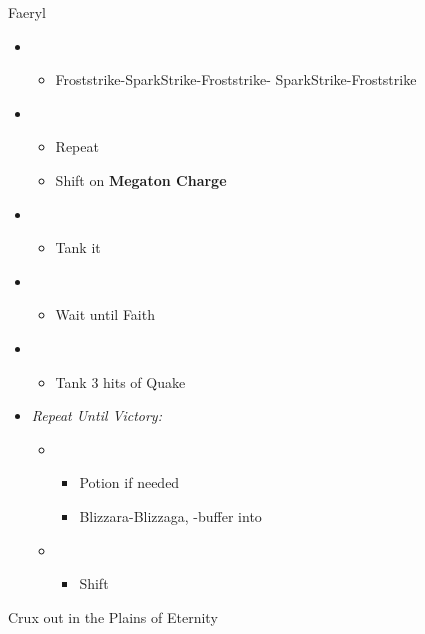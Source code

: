 \begin{battle}{Faeryl}
\begin{itemize}
	\item \sixth
	\begin{itemize}
		\item Froststrike-SparkStrike-Froststrike- SparkStrike-Froststrike
	\end{itemize}
	\item \fifth
	\begin{itemize}
		\item Repeat
		\item Shift on \textbf{Megaton Charge}
	\end{itemize}
	\item \fourth
	\begin{itemize}
		\item Tank it
	\end{itemize}
	\item \second
	\begin{itemize}
		\item Wait until Faith
	\end{itemize}
	\item \fourth
	\begin{itemize}
		\item Tank 3 hits of Quake
	\end{itemize}
	\item \textit{Repeat Until Victory:}
	\begin{itemize}
	\item \sixth
	\begin{itemize}
		\item Potion if needed
		\item Blizzara-Blizzaga, \com-buffer into
	\end{itemize}
	\item \first
	\begin{itemize}
		\item Shift
	\end{itemize}
	\end{itemize}
\end{itemize}
\end{battle}


Crux out in the Plains of Eternity